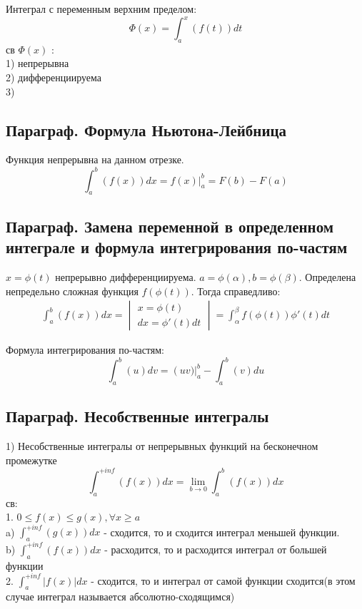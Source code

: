 \documentclass[a4paper, 12pt]{article}
\begin{document}
Интеграл с переменным верхним пределом:\\
\[
  \Phi (x) = \int_{a}^{x}\left(f(t)\right)dt 
\]
св $ \Phi (x) $ :\\
1) непрерывна\\
2) дифференциируема\\
3) 

\subsection{Параграф. Формула Ньютона-Лейбница}
Функция непрерывна на данном отрезке.
\[
  \int_{a}^{b}\left(f(x)\right)dx = f(x) |_a^b = F(b) - F(a)
\]

\subsection{Параграф. Замена переменной в определенном интеграле и формула интегрирования по-частям}
$ x = \phi(t) $ непрерывно дифференциируема. $ a = \phi(\alpha ),b = \phi(\beta ) $. Определена непредельно сложная функция $ f(\phi(t)) $. Тогда справедливо:
\begin{align*}
    \int_{a}^{b}\left(f(x)\right)dx = \begin{vmatrix}
    x = \phi(t)\\ dx = \phi'(t)dt
  \end{vmatrix}= \int_{\alpha }^{\beta }f(\phi(t))\phi'(t)dt 
  \end{align*}

Формула интегрирования по-частям:\\
\[
  \int_{a}^{b}\left(u\right)dv = \left (uv)\right|_a^b - \int_{a}^{b}\left(v\right)du  
\]

\subsection{Параграф. Несобственные интегралы}
1) Несобственные интегралы от непрерывных функций на бесконечном промежутке\\
\[
  \int_{a}^{+inf}\left(f(x)\right)dx = \lim_{b\to 0}  \int_{a}^{b}\left(f(x)\right)dx 
\]
св:\\
1. $ 0\leq f(x)\leq g(x),\forall x \geq a $\\
a) $ \int_{a}^{+inf}\left(g(x)\right)dx  $ - сходится, то и сходится интеграл меньшей функции.\\
b) $ \int_{a}^{+inf}\left(f(x)\right)dx  $ - расходится, то и расходится интеграл от большей функции\\
2. $ \int_{a}^{+inf}|f\left(x\right)|dx  $ - сходится, то и интеграл от самой функции сходится(в этом случае интеграл называется абсолютно-сходящимся)\\
\end{document}
